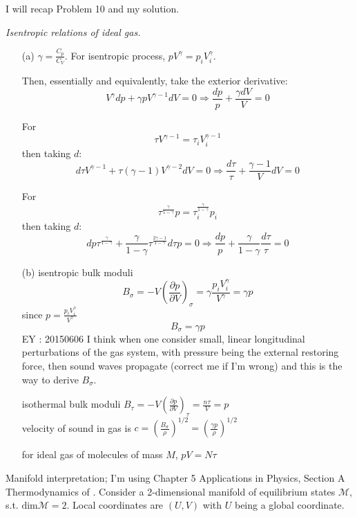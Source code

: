 \documentclass[twoside]{amsart}
\theoremstyle{plain}
\theoremstyle{definition}
\begin{document}
I will recap Problem 10 and my solution.  

\emph{Isentropic relations of ideal gas.}

\begin{enumerate}
  \item[(a)] $\gamma = \frac{C_p}{C_V}$.  For isentropic process, $pV^{\gamma} = p_i V_i^{\gamma}$.  

Then, essentially and equivalently, take the exterior derivative:
\[
V^{\gamma}dp + \gamma p V^{\gamma -1} dV = 0 \Longrightarrow \frac{dp}{p} + \frac{\gamma dV}{ V} = 0 
\]

For 
\[
\tau V^{\gamma-1} = \tau_i V_i^{\gamma-1}
\]
then taking $d$:
\[
d\tau V^{\gamma-1} + \tau(\gamma -1) V^{\gamma -2} dV = 0 \Longrightarrow \frac{d\tau}{\tau } + \frac{ \gamma -1}{V} dV = 0 
\]

For 
\[
\tau^{ \frac{ \gamma}{ 1 - \gamma }} p = \tau_i^{\frac{ \gamma}{ 1 - \gamma } } p_i
\]
then taking $d$:
\[
dp \tau^{ \frac{\gamma}{1- \gamma }} + \frac{ \gamma }{ 1 - \gamma} \tau^{ \frac{2 \gamma -1 }{ 1- \gamma }} d\tau p = 0 \Longrightarrow \frac{dp}{p} + \frac{ \gamma }{ 1 - \gamma} \frac{d\tau}{\tau} = 0 
\]
  \item[(b)] isentropic bulk moduli
\[
B_{\sigma} = -V \left( \frac{ \partial p }{ \partial V} \right)_{\sigma} = \gamma \frac{ p_i V_i^{\gamma }}{ V^{\gamma }} = \gamma p
\]
since $p = \frac{ p_i V_i^{\gamma }}{ V^{\gamma}}$
\[
\boxed{ B_{\sigma} = \gamma p }
\]
EY : 20150606 I think when one consider small, linear longitudinal perturbations of the gas system, with pressure being the external restoring force, then sound waves propagate (correct me if I'm wrong) and this is the way to derive $B_{\sigma}$.  

isothermal bulk moduli $B_{\tau} = -V \left( \frac{ \partial p }{ \partial V }\right)_{\tau} = \frac{n\tau}{V} = p$
 \\
velocity of sound in gas is $c = \left( \frac{ B_{\sigma}}{ \rho } \right)^{1/2} = \left( \frac{ \gamma p }{ \rho } \right)^{1/2}$

for ideal gas of molecules of mass $M$, $pV = N\tau$

\end{enumerate}

Manifold interpretation; I'm using Chapter 5 Applications in Physics, Section A Thermodynamics of \cite{BSchutz1980}.  Consider a 2-dimensional manifold of equilibrium states $\mathcal{M}$, s.t. $\text{dim}\mathcal{M} =2$.  Local coordinates are $(U,V)$ with $U$ being a global coordinate.  
\end{document}
